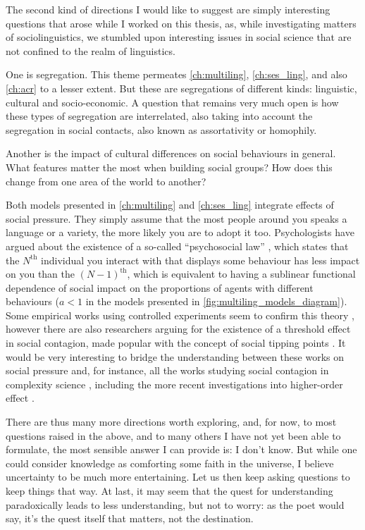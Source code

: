 \documentclass[../thesis.tex]{subfiles}
\begin{document}
The second kind of directions I would like to suggest are simply interesting questions
that arose while I worked on this thesis, as, while investigating matters of
sociolinguistics, we stumbled upon interesting issues in social science that are not
confined to the realm of linguistics.

One is segregation. This theme permeates \cref{ch:multiling},
\cref{ch:ses_ling}, and also \cref{ch:acr} to a lesser extent. But these are
segregations of different kinds: linguistic, cultural and socio-economic. A question
that remains very much open is how these types of segregation are interrelated, also
taking into account the segregation in social contacts, also known as assortativity or
homophily.

Another is the impact of cultural differences on social behaviours in general. What
features matter the most when building social groups? How does this change from one area
of the world to another?

Both models presented in \cref{ch:multiling} and \cref{ch:ses_ling} integrate effects of
social pressure. They simply assume that the most people around you speaks a language or
a variety, the more likely you are to adopt it too. Psychologists have argued about the
existence of a so-called ``psychosocial law'' \cite{LatanePsychologySocial1981}, which
states that the $N^\text{th}$ individual you interact with that displays some behaviour
has less impact on you than the $(N - 1)^\text{th}$, which is equivalent to having a
sublinear functional dependence of social impact on the proportions of agents with
different behaviours ($a < 1$ in the models presented in
\cref{fig:multiling_models_diagram}). Some empirical works using controlled experiments
seem to confirm this theory \cite{GerardConformityGroup1968,MilgramNoteDrawing1969},
however there are also researchers arguing for the existence of a threshold effect in
social contagion, made popular with the concept of social tipping points
\cite{MilkoreitDefiningTipping2018}. It would be very interesting to bridge the
understanding between these works on social pressure and, for instance, all the works
studying social contagion in complexity science \cite{WattsInfluentialsNetworks2007},
including the more recent investigations into higher-order effect
\cite{IacopiniSimplicialModels2019}.

There are thus many more directions worth exploring, and, for now, to most questions
raised in the above, and to many others I have not yet been able to formulate, the most
sensible answer I can provide is: I don't know. But while one could consider knowledge
as comforting some faith in the universe, I believe uncertainty to be much more
entertaining. Let us then keep asking questions to keep things that way.
At last, it may seem that the quest for understanding paradoxically leads to less
understanding, but not to worry:
as the poet would say,
it's the quest itself that matters, not the destination.
\end{document}
